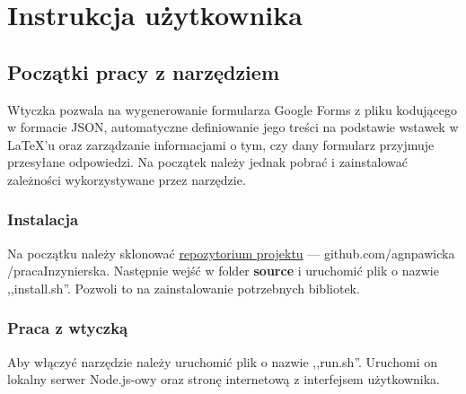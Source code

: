 
\chapter{Instrukcja użytkownika}
\section{Początki pracy  z narzędziem}
Wtyczka pozwala na wygenerowanie formularza Google Forms z pliku kodującego w formacie JSON, automatyczne definiowanie jego treści na podstawie wstawek w \LaTeX{}'u oraz zarządzanie informacjami o tym, czy dany formularz przyjmuje przesyłane odpowiedzi. Na początek należy jednak pobrać i zainstalować zależności wykorzystywane przez narzędzie.
\subsection{Instalacja}
Na początku należy sklonować \href{https://github.com/agnpawicka/pracaInzynierska/}{repozytorium projektu} --- github.com/agnpawicka /pracaInzynierska.
\ind Następnie wejść w folder \textbf{source} i uruchomić plik o nazwie ,,install.sh''. Pozwoli to na zainstalowanie potrzebnych bibliotek.
\subsection{Praca z wtyczką}
Aby włączyć narzędzie należy uruchomić plik o nazwie ,,run.sh''. Uruchomi on lokalny serwer Node.js-owy oraz stronę internetową z interfejsem użytkownika.
